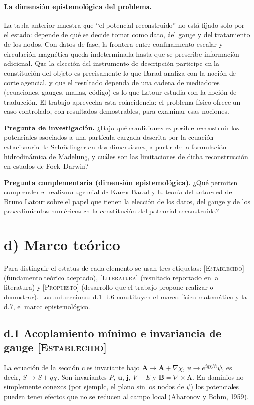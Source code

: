 \documentclass[12pt,letterpaper]{article}
\newcommand{\uv}{\mathbf{u}}
\newcommand{\jv}{\mathbf{j}}
\newcommand{\Av}{\mathbf{A}}
\newcommand{\Bv}{\mathbf{B}}
\newcommand{\grad}{\nabla}
\newcommand{\EST}{\textsc{[Establecido]}}
\newcommand{\LIT}{\textsc{[Literatura]}}
\newcommand{\PRO}{\textsc{[Propuesto]}}
\begin{document}
\paragraph{La dimensión epistemológica del problema.} La tabla anterior muestra que ``el potencial reconstruido'' no está
fijado solo por el estado: depende de qué se decide tomar como dato, del gauge y del tratamiento de los nodos. Con datos
de fase, la frontera entre confinamiento escalar y circulación magnética queda indeterminada hasta que se prescribe
información adicional. Que la elección del instrumento de descripción participe en la constitución del objeto es
precisamente lo que Barad analiza con la noción de corte agencial, y que el resultado dependa de una cadena de mediadores
(ecuaciones, gauges, mallas, código) es lo que Latour estudia con la noción de traducción. El trabajo aprovecha esta
coincidencia: el problema físico ofrece un caso controlado, con resultados demostrables, para examinar esas nociones.

\medskip
\noindent\textbf{Pregunta de investigación.} ¿Bajo qué condiciones es posible reconstruir los potenciales asociados a una
partícula cargada descrita por la ecuación estacionaria de Schrödinger en dos dimensiones, a partir de la formulación
hidrodinámica de Madelung, y cuáles son las limitaciones de dicha reconstrucción en estados de Fock--Darwin?

\medskip
\noindent\textbf{Pregunta complementaria (dimensión epistemológica).} ¿Qué permiten comprender el realismo agencial de
Karen Barad y la teoría del actor-red de Bruno Latour sobre el papel que tienen la elección de los datos, del gauge y de
los procedimientos numéricos en la constitución del potencial reconstruido?

\section*{d) Marco teórico}
Para distinguir el estatus de cada elemento se usan tres etiquetas: \EST{} (fundamento teórico aceptado), \LIT{}
(resultado reportado en la literatura) y \PRO{} (desarrollo que el trabajo propone realizar o demostrar). Las
subsecciones d.1--d.6 constituyen el marco físico-matemático y la d.7, el marco epistemológico.

\subsection*{d.1 Acoplamiento mínimo e invariancia de gauge \EST}
La ecuación de la sección c es invariante bajo $\Av\to\Av+\grad\chi$, $\psi\to e^{iq\chi/\hbar}\psi$, es decir,
$S\to S+q\chi$. Son invariantes $P$, $\uv$, $\jv$, $V-E$ y $\Bv=\grad\times\Av$. En dominios no simplemente conexos (por
ejemplo, el plano sin los nodos de $\psi$) los potenciales pueden tener efectos que no se reducen al campo local
(Aharonov y Bohm, 1959).
\end{document}
